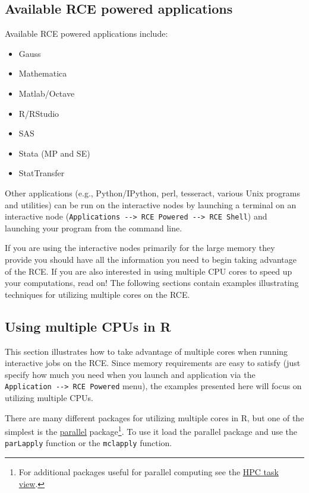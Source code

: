 \documentclass[11pt]{article}
\begin{document}
\subsection{Available RCE powered applications}
\label{sec-6-2}

Available RCE powered applications include:
\begin{itemize}
\item Gauss
\item Mathematica
\item Matlab/Octave
\item R/RStudio
\item SAS
\item Stata (MP and SE)
\item StatTransfer
\end{itemize}

Other applications (e.g., Python/IPython, perl, tesseract, various Unix programs and utilities) can be run on the interactive nodes by launching a terminal on an interactive node (\texttt{Applications -{}-> RCE Powered -{}-> RCE Shell}) and launching your program from the command line.

If you are using the interactive nodes primarily for the large memory they provide you should have all the information you need to begin taking advantage of the RCE. If you are also interested in using multiple CPU cores to speed up your computations, read on! The following sections contain examples illustrating techniques for utilizing multiple cores on the RCE.

\subsection{Using multiple CPUs in R}
\label{sec-6-3}
This section illustrates how to take advantage of multiple cores when running interactive jobs on the RCE. Since memory requirements are easy to satisfy (just specify how much you need when you launch and application via the \texttt{Application -{}-> RCE Powered} menu), the examples presented here will focus on utilizing multiple CPUs. 

There are many different packages for utilizing multiple cores in R, but one of the simplest is the \href{https://stat.ethz.ch/R-manual/R-devel/library/parallel/doc/parallel.pdf}{parallel} package\footnote{For additional packages useful for parallel computing see the \href{http://cran.r-project.org/web/views/HighPerformanceComputing.html}{HPC task view}.}. To use it load the parallel package and use the \texttt{parLapply} function or the \texttt{mclapply} function. 
\end{document}
